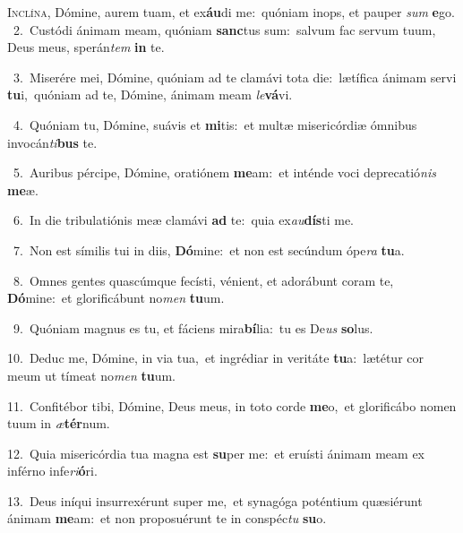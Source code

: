 \lettrine{\initial\textcolor{\initialcolor}{I}}{nclína,} Dómine, aurem tuam, et ex\-\textbf{áu}\-di me:~\star quóniam inops, et pauper \textit{sum} \textbf{e}\-go.\\
{\numbfont\textcolor{\numbcolor}{~2.}}~Custódi ánimam meam, quóniam \textbf{sanc}\-tus sum:~\star salvum fac servum tuum, Deus meus, sperán\textit{tem} \textbf{in} te.\par
{\numbfont\textcolor{\numbcolor}{~3.}}~Miserére mei, Dómine, quóniam ad te clamávi tota die:~\dagger lætífica ánimam servi \textbf{tu}\-i,~\star quóniam ad te, Dómine, ánimam meam \textit{le}\-\textbf{vá}vi.\par
{\numbfont\textcolor{\numbcolor}{~4.}}~Quóniam tu, Dómine, suávis et \textbf{mi}\-tis:~\star et multæ misericórdiæ ómnibus invocán\-\textit{ti}\-\textbf{bus} te.\par
{\numbfont\textcolor{\numbcolor}{~5.}}~Auribus pércipe, Dómine, oratiónem \textbf{me}\-am:~\star et inténde voci deprecatió\textit{nis} \textbf{me}\-æ.\par
{\numbfont\textcolor{\numbcolor}{~6.}}~In die tribulatiónis meæ clamávi \textbf{ad} te:~\star quia ex\-\textit{au}\-\textbf{dís}ti me.\par
{\numbfont\textcolor{\numbcolor}{~7.}}~Non est símilis tui in diis, \textbf{Dó}\-mine:~\star et non est secúndum ópe\textit{ra} \textbf{tu}\-a.\par
{\numbfont\textcolor{\numbcolor}{~8.}}~Omnes gentes quascúmque fecísti, vénient, et adorábunt coram te, \textbf{Dó}\-mine:~\star et glorificábunt no\textit{men} \textbf{tu}\-um.\par
{\numbfont\textcolor{\numbcolor}{~9.}}~Quóniam magnus es tu, et fáciens mira\-\textbf{bí}\-lia:~\star tu es De\textit{us} \textbf{so}\-lus.\par
{\numbfont\textcolor{\numbcolor}{10.}}~Deduc me, Dómine, in via tua,~\dagger et ingrédiar in veritáte \textbf{tu}\-a:~\star lætétur cor meum ut tímeat no\textit{men} \textbf{tu}\-um.\par
{\numbfont\textcolor{\numbcolor}{11.}}~Confitébor tibi, Dómine, Deus meus, in toto corde \textbf{me}\-o,~\star et glorificábo nomen tuum in \textit{æ}\-\textbf{tér}num.\par
{\numbfont\textcolor{\numbcolor}{12.}}~Quia misericórdia tua magna est \textbf{su}\-per me:~\star et eruísti ánimam meam ex inférno infe\-\textit{ri}\-\textbf{ó}ri.\par
{\numbfont\textcolor{\numbcolor}{13.}}~Deus iníqui insurrexérunt super me,~\dagger et synagóga poténtium quæsiérunt ánimam \textbf{me}\-am:~\star et non proposuérunt te in conspéc\textit{tu} \textbf{su}\-o.\par
